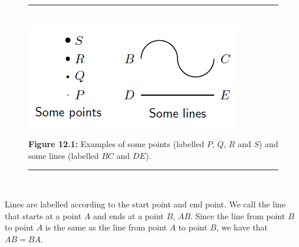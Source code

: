 	\begin{figure}[H] %
    \begin{center}
    \rule[.1in]{\figurerulewidth}{.005in} \\
        \label{m39370*uid7!!!underscore!!!media}\label{m39370*uid7!!!underscore!!!printimage}\includegraphics{col11306.imgs/m39370_MG10C13_001.png} %
      \vspace{2pt}
    \vspace{\rubberspace}\par \begin{cnxcaption}
	  \small \textbf{Figure 12.1: }Examples of some points (labelled $P$, \begin{math}Q\end{math}, \begin{math}R\end{math} and \begin{math}S\end{math}\hspace{1ex}) and some lines (labelled \begin{math}BC\end{math} and \begin{math}DE\end{math}\hspace{1ex}).
	\end{cnxcaption}
    \vspace{.1in}
    \rule[.1in]{\figurerulewidth}{.005in} \\
    \end{center}
 \end{figure}       
      \label{m39370*id313170}Lines are labelled according to the start point and end point. We call the line that starts at a point $A$ and ends at a point \begin{math}B\end{math}, \begin{math}AB\end{math}. Since the line from point \begin{math}B\end{math} to point \begin{math}A\end{math} is the same as the line from point \begin{math}A\end{math} to point \begin{math}B\end{math}, we have that \begin{math}AB=BA\end{math}.\par 

